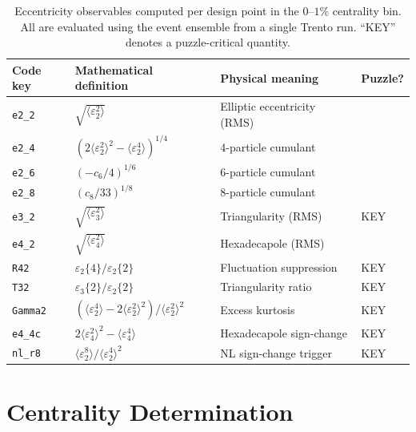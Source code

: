 \documentclass[12pt,a4paper,twoside]{report}
\newcommand{\mean}[1]{\langle #1 \rangle}
\begin{document}
\begin{table}[htbp]
\centering
\caption{Eccentricity observables computed per design point in the
  $0$--$1\%$ centrality bin.  All are evaluated using the event ensemble
  from a single Trento run.  ``KEY'' denotes a puzzle-critical quantity.}
\label{tab:observables}
\begin{tabular}{llll}
\toprule
Code key & Mathematical definition & Physical meaning & Puzzle? \\
\midrule
\texttt{e2\_2} & $\sqrt{\mean{\varepsilon_2^2}}$ & Elliptic eccentricity (RMS) & \\
\texttt{e2\_4} & $(2\mean{\varepsilon_2^2}^2 - \mean{\varepsilon_2^4})^{1/4}$ & 4-particle cumulant & \\
\texttt{e2\_6} & $(-c_6/4)^{1/6}$ & 6-particle cumulant & \\
\texttt{e2\_8} & $(c_8/33)^{1/8}$ & 8-particle cumulant & \\
\texttt{e3\_2} & $\sqrt{\mean{\varepsilon_3^2}}$ & Triangularity (RMS) & KEY \\
\texttt{e4\_2} & $\sqrt{\mean{\varepsilon_4^2}}$ & Hexadecapole (RMS) & \\
\texttt{R42}   & $\varepsilon_2\{4\}/\varepsilon_2\{2\}$ & Fluctuation suppression & KEY \\
\texttt{T32}   & $\varepsilon_3\{2\}/\varepsilon_2\{2\}$ & Triangularity ratio & KEY \\
\texttt{Gamma2}& $(\mean{\varepsilon_2^4} - 2\mean{\varepsilon_2^2}^2)/\mean{\varepsilon_2^2}^2$ & Excess kurtosis & KEY \\
\texttt{e4\_4c}& $2\mean{\varepsilon_4^2}^2 - \mean{\varepsilon_4^4}$ & Hexadecapole sign-change & KEY \\
\texttt{nl\_r8}& $\mean{\varepsilon_2^8}/\mean{\varepsilon_2^4}^2$ & NL sign-change trigger & KEY \\
\bottomrule
\end{tabular}
\end{table}

\section{Centrality Determination}
\label{sec:centrality}
\end{document}

